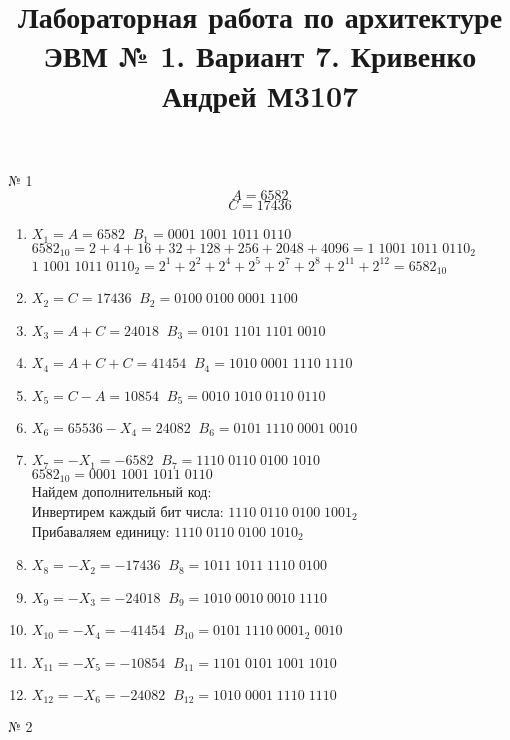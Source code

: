 \documentclass{article}
\title{Лабораторная работа по архитектуре ЭВМ № 1. Вариант 7. Кривенко Андрей М3107}
\begin{document}
\maketitle
№ 1 \\
\[ A = 6582 \]
\[ C = 17436 \]
\begin{enumerate}
  \item $ X_{1} = A = 6582 \; \; B_{1} = 0001 \; 1001 \; 1011 \; 0110 $ \\ 
  $ 6582_{10} = 2 + 4 + 16 + 32 + 128 + 256 + 2048 + 4096 = 1 \; 1001 \; 1011 \; 0110_{2} $
  $ 1 \; 1001 \; 1011 \; 0110_{2} = 2^{1} + 2^{2} +2^{4} + 2^{5} + 2^{7} + 2^{8} + 2^{11} + 2^{12} = 6582_{10} $
  \item $ X_{2} = C = 17436 \; \; B_{2} = 0100 \; 0100 \; 0001 \; 1100 $
  \item $ X_{3} = A + C = 24018 \; \; B_{3} = 0101 \; 1101 \; 1101 \; 0010 $
  \item $ X_{4} = A + C + C = 41454 \; \; B_{4} = 1010 \; 0001 \; 1110 \; 1110 $ 
  \item $ X_{5} = C - A = 10854 \; \; B_{5} = 0010 \; 1010 \; 0110 \; 0110 $
  \item $ X_{6} = 65536 - X_{4} = 24082 \; \; B_{6} = 0101 \; 1110 \; 0001 \; 0010 $
  \item $ X_{7} = -X_{1} = -6582 \; \; B_{7} = 1110 \; 0110 \; 0100 \; 1010 $ \\
  $ 6582_{10} = 0001 \; 1001 \; 1011 \; 0110 $ \\
  Найдем дополнительный код: \\
  Инвертирем каждый бит числа: $ 1110 \; 0110 \; 0100 \; 1001_{2} $ \\
  Прибаваляем единицу: $ 1110 \; 0110 \; 0100 \; 1010_{2} $
  \item $ X_{8} = -X_{2} = -17436 \; \; B_{8} = 1011 \; 1011 \; 1110 \; 0100 $
  \item $ X_{9} = -X_{3} = -24018 \; \; B_{9} = 1010 \; 0010 \; 0010 \; 1110 $
  \item $ X_{10} = -X_{4} = -41454 \; \; B_{10} = 0101 \; 1110 \; 0001_{2} \; 0010 $ 
  \item $ X_{11} = -X_{5} = -10854 \; \; B_{11} = 1101 \; 0101 \; 1001 \; 1010 $
  \item $ X_{12} = -X_{6} = -24082 \; \; B_{12} = 1010 \; 0001 \; 1110 \; 1110 $
\end{enumerate}
№ 2 \\
\end{document}
